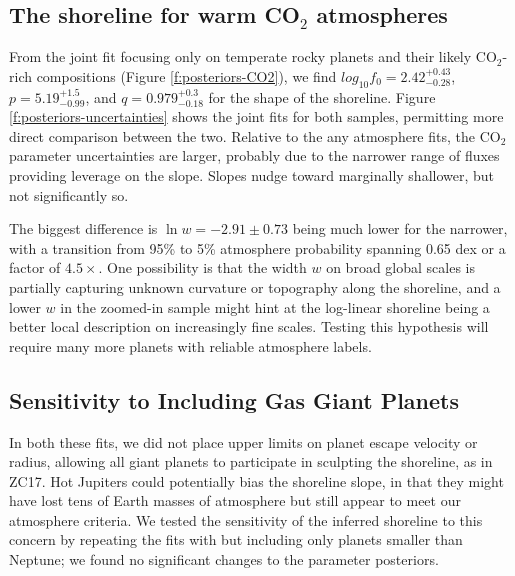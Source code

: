 \documentclass[modern,linenumbers,trackchanges]{aastex7}
\begin{document}

\subsection{The shoreline for {\bf warm CO$_2$} atmospheres}

From the joint fit focusing only on temperate rocky planets and their likely CO$_2$-rich compositions (Figure \ref{f:posteriors-CO2}), we find $log_{10} f_0 = 2.42_{-0.28}^{+0.43}$, $p = 5.19_{-0.99}^{+1.5}$, and $q = 0.979_{-0.18}^{+0.3}$ for the shape of the shoreline. 
Figure \ref{f:posteriors-uncertainties} shows the joint fits for both samples, permitting more direct comparison between the two. Relative to the any atmosphere fits, the CO$_2$ parameter uncertainties are larger, probably due to the narrower range of fluxes providing leverage on the slope. Slopes nudge toward marginally shallower, but not significantly so. 

The biggest difference is $\ln w = -2.91 \pm 0.73$ being much lower for the narrower, with a transition from 95\% to 5\% atmosphere probability spanning 0.65 dex or a factor of $4.5\times$. One possibility is that the width $w$ on broad global scales is partially capturing unknown curvature or topography along the shoreline, and a lower $w$ in the zoomed-in sample might hint at the log-linear shoreline being a better local description on increasingly fine scales. Testing this hypothesis will require many more planets with reliable atmosphere labels. 

\subsection{Sensitivity to Including Gas Giant Planets}
In both these fits, we did not place upper limits on planet escape velocity or radius, allowing all giant planets to participate in sculpting the shoreline, as in ZC17. Hot Jupiters could potentially bias the shoreline slope, in that they might have lost tens of Earth masses of atmosphere but still appear to meet our atmosphere criteria. We tested the sensitivity of the inferred shoreline to this concern by repeating the fits with but including only planets smaller than Neptune; we found no significant changes to the parameter posteriors. 
\end{document}

